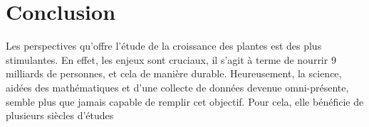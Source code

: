 \section*{Conclusion}

Les perspectives qu'offre l'étude de la croissance des plantes est des plus stimulantes. En effet, les enjeux sont cruciaux, il s'agit à terme de nourrir 9 milliards de personnes, et cela de manière durable. Heureusement, la science, aidées des mathématiques et d'une collecte de données devenue omni-présente, semble plus que jamais capable de remplir cet objectif. Pour cela, elle bénéficie de plusieurs siècles d'études